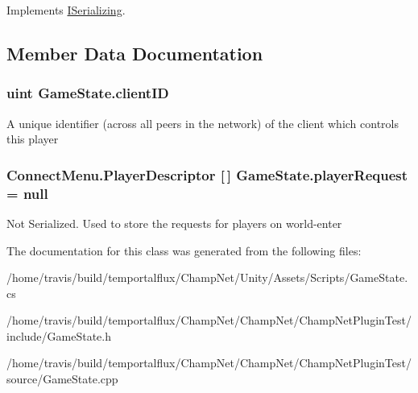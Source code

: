 Implements \hyperlink{interface_i_serializing_ac31a44c2358a197e774fa3f79cc80356}{I\-Serializing}.



\subsection{Member Data Documentation}
\hypertarget{class_game_state_ad24a423ba6655fc6541b2f12ce98e0d0}{
\subsubsection[{client\-I\-D}]{\setlength{\rightskip}{0pt plus 5cm}uint Game\-State.\-client\-I\-D}}\label{class_game_state_ad24a423ba6655fc6541b2f12ce98e0d0}


A unique identifier (across all peers in the network) of the client which controls this player 

\hypertarget{class_game_state_a8b1949523ac8e40776c0617666023d64}{
\subsubsection[{player\-Request}]{\setlength{\rightskip}{0pt plus 5cm}Connect\-Menu.\-Player\-Descriptor \mbox{[}$\,$\mbox{]} Game\-State.\-player\-Request = null}}\label{class_game_state_a8b1949523ac8e40776c0617666023d64}


Not Serialized. Used to store the requests for players on world-\/enter 



The documentation for this class was generated from the following files\-:\begin{DoxyCompactItemize}
\item 
/home/travis/build/temportalflux/\-Champ\-Net/\-Unity/\-Assets/\-Scripts/Game\-State.\-cs\item 
/home/travis/build/temportalflux/\-Champ\-Net/\-Champ\-Net/\-Champ\-Net\-Plugin\-Test/include/Game\-State.\-h\item 
/home/travis/build/temportalflux/\-Champ\-Net/\-Champ\-Net/\-Champ\-Net\-Plugin\-Test/source/Game\-State.\-cpp\end{DoxyCompactItemize}
